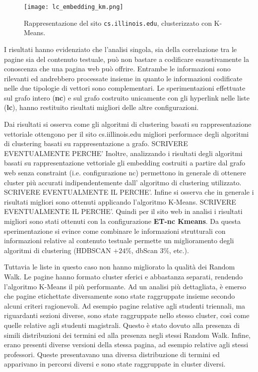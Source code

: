 \begin{figure}[ht!]
	\centering
	\texttt{[image: lc\_embedding\_km.png]}
	\caption{Rappresentazione del sito \texttt{cs.illinois.edu}, clusterizzato con K-Means.}
	\label{nc_embedding_km}
\end{figure}

I risultati hanno evidenziato che l'analisi singola, sia della correlazione tra le pagine sia del contenuto testuale, può non bastare a codificare esaustivamente la conoscenza che una pagina web può offrire. Entrambe le informazioni sono rilevanti ed andrebbero processate insieme in quanto le informazioni codificate nelle due tipologie di vettori sono complementari.
\color{red}Le sperimentazioni effettuate sul grafo intero (\textbf{nc}) e sul grafo costruito unicamente con gli hyperlink nelle liste (\textbf{lc}), hanno restituito risultati migliori delle altre configurazioni. \color{black}

Dai risultati si osserva come gli algoritmi di clustering basati su rappresentazione vettoriale ottengono per il sito cs.iillinois.edu migliori performace degli algoritmi di clustering basati su rappresentazione a grafo. SCRIVERE EVENTUALMENTE PERCHE'
Inoltre, analizzando i risultati degli algoritmi basati su rappresentazione vettoriale gli embedding costruiti a partire dal grafo web senza constraint (i.e. configurazione nc) permettono in generale di ottenere cluster più accurati indipendentemente dall' algoritmo di clustering utilizzato.
SCRIVERE EVENTUALMENTE IL PERCHE'.
Infine si osserva che in generale i risultati migliori sono ottenuti applicando l'algoritmo K-Means. SCRIVERE EVENTUALMENTE IL PERCHE'.
Quindi per il sito web in analisi i risultati migliori sono stati ottenuti con la configurazione \textbf{ET-nc Kmeans}. 
Da questa sperimentazione si evince come combinare le informazioni strutturali con informazioni relative al contenuto testuale permette un miglioramento degli algoritmi di clustering (HDBSCAN $+24\%$, dbScan $3\%$, etc.). 


Tuttavia le liste in questo caso non hanno migliorato la qualità dei Random Walk. Le pagine hanno formato cluster sferici e abbastanza separati, rendendo l'algoritmo K-Means il più performante. Ad un analisi più dettagliata, è emerso che pagine etichettate diversamente sono state raggruppate insieme secondo alcuni criteri ragionevoli. Ad esempio pagine relative agli studenti triennali, ma riguardanti sezioni diverse, sono state raggruppate nello stesso cluster, così come quelle relative agli studenti magistrali. Questo è stato dovuto alla presenza di simili distribuzioni dei termini ed alla presenza negli stessi Random Walk. Infine, erano presenti diverse versioni della stessa pagina, ad esempio relative agli stessi professori. Queste presentavano una diversa distribuzione di termini ed apparivano in percorsi diversi e sono state raggruppate in cluster diversi.

